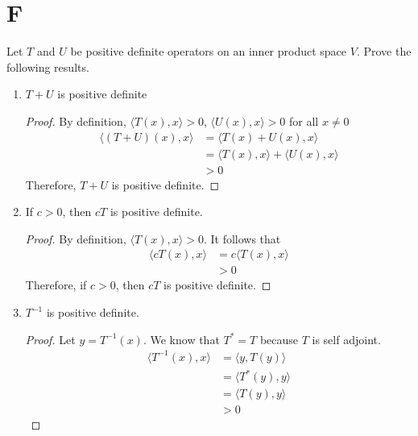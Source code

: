 \documentclass[11pt]{scrartcl}
\begin{document}
\section{F}
Let $T$ and $U$ be positive definite operators on an inner product space $V$. Prove the following results.
\begin{enumerate}[label=\alph*.]
	\item {
	      $T + U$ is positive definite
	      \begin{proof}
		      By definition,  $\langle T(x),x \rangle > 0$, $\langle U(x),x \rangle > 0$ for all $x \neq 0$
		      \begin{align*}
			      \langle (T + U)(x),x \rangle & = \langle T(x) + U(x),x \rangle                     \\
			                                   & = \langle T(x) ,x \rangle  + \langle U(x),x \rangle \\
			                                   & > 0
		      \end{align*}
		      Therefore, $T + U$ is positive definite.
	      \end{proof}
	      }
	\item{
	      If $c > 0$, then $cT$ is positive definite.
	      \begin{proof}
		      By definition, $\langle T(x),x \rangle > 0$. It follows that
		      \begin{align*}
			      \langle cT(x),x \rangle & =  c\langle T(x),x \rangle \\
			                              & > 0
		      \end{align*}
		      Therefore, if $c > 0$, then $cT$ is positive definite.
	      \end{proof}
	      }
	\item{
	      $T^{-1}$ is positive definite.
	      \begin{proof}
		      Let $y =  T^{-1}(x)$.
		      We know that $T^* = T$ because $T$ is self adjoint.
		      \begin{align*}
			      \langle T^{-1}(x),x \rangle & = \langle y,T(y) \rangle   \\
			                                  & = \langle T^*(y),y \rangle \\
			                                  & = \langle T(y),y \rangle   \\
			                                  & > 0
		      \end{align*}
	      \end{proof}
	      }
\end{enumerate}
\end{document}
